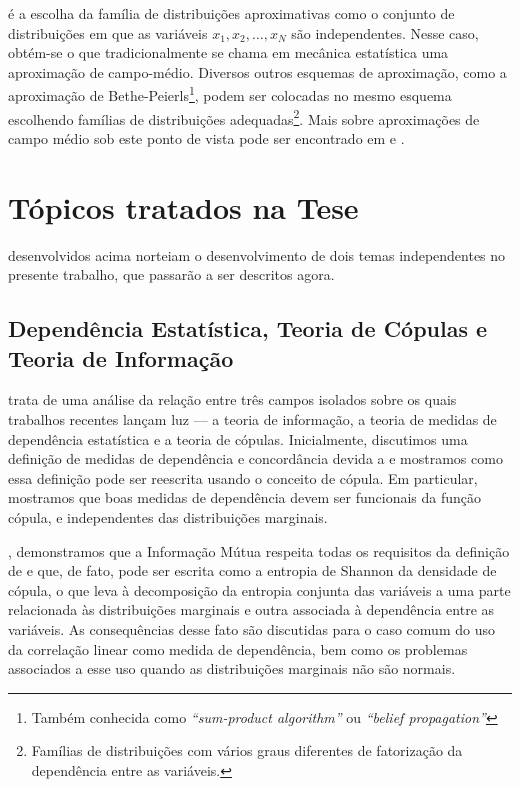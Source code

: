  é a escolha da família de distribuições aproximativas como o conjunto de distribuições em que as variáveis $x_1, x_2, \ldots, x_N$ são independentes. Nesse caso, obtém-se o que tradicionalmente se chama em mecânica estatística uma aproximação de campo-médio. Diversos outros esquemas de aproximação, como a aproximação de Bethe-Peierls\footnote[][-4.5cm]{Também conhecida como \emph{``sum-product algorithm''} ou \emph{``belief propagation''}}, podem ser colocadas no mesmo esquema escolhendo famílias de distribuições adequadas\footnote[][-4.5cm]{Famílias de distribuições com vários graus diferentes de fatorização da dependência entre as variáveis.}. Mais sobre aproximações de campo médio sob este ponto de vista pode ser encontrado em \citet{Opper2001}\cite[-3.5cm]{Opper2001} e \citet{Mezard2009}\cite[-1.5cm]{Mezard2009}.

\section{Tópicos tratados na Tese}
 desenvolvidos acima norteiam o desenvolvimento de dois temas independentes no presente trabalho, que passarão a ser descritos agora. 

\subsection{Dependência Estatística, Teoria de Cópulas e Teoria de Informação}

 trata de uma análise da relação entre três campos isolados sobre os quais trabalhos recentes lançam luz --- a teoria de informação, a teoria de medidas de dependência estatística e a teoria de cópulas. Inicialmente, discutimos uma definição de medidas de dependência e concordância devida a \citet{Renyi1959} e mostramos como essa definição pode ser reescrita usando o conceito de cópula. Em particular, mostramos que boas medidas de dependência devem ser funcionais da função cópula, e independentes das distribuições marginais. 

, demonstramos que a Informação Mútua respeita todas os requisitos da definição de \citet{Renyi1959} e que, de fato, pode ser escrita como a entropia de Shannon da densidade de cópula, o que leva à decomposição da entropia conjunta das variáveis a uma parte relacionada às distribuições marginais e outra associada à dependência entre as variáveis. As consequências desse fato são discutidas para o caso comum do uso da correlação linear como medida de dependência, bem como os problemas associados a esse uso quando as distribuições marginais não são normais. 

